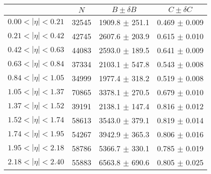\begin{tabular}{lccc}
\hline
    &   $N$   & $B \pm \delta B$  &  $C \pm \delta C$ \\
\hline
$0.00 < |\eta| <0.21$          & 32545      & 1909.8     $\pm$ 251.1 & 0.469      $\pm$ 0.009 \\
$0.21 < |\eta| <0.42$          & 42745      & 2607.6     $\pm$ 203.9 & 0.615      $\pm$ 0.010 \\
$0.42 < |\eta| <0.63$          & 44083      & 2593.0     $\pm$ 189.5 & 0.641      $\pm$ 0.009 \\
$0.63 < |\eta| <0.84$          & 37334      & 2103.1     $\pm$ 547.8 & 0.543      $\pm$ 0.008 \\
$0.84 < |\eta| <1.05$          & 34999      & 1977.4     $\pm$ 318.2 & 0.519      $\pm$ 0.008 \\
$1.05 < |\eta| <1.37$          & 70865      & 3378.1     $\pm$ 270.5 & 0.679      $\pm$ 0.010 \\
$1.37 < |\eta| <1.52$          & 39191      & 2138.1     $\pm$ 147.4 & 0.816      $\pm$ 0.012 \\
$1.52 < |\eta| <1.74$          & 58613      & 3543.0     $\pm$ 379.1 & 0.819      $\pm$ 0.014 \\
$1.74 < |\eta| <1.95$          & 54267      & 3942.9     $\pm$ 365.3 & 0.806      $\pm$ 0.016 \\
$1.95 < |\eta| <2.18$          & 58786      & 5366.7     $\pm$ 330.1 & 0.785      $\pm$ 0.019 \\
$2.18 < |\eta| <2.40$          & 55883      & 6563.8     $\pm$ 690.6 & 0.805      $\pm$ 0.025 \\
\hline
\end{tabular}
